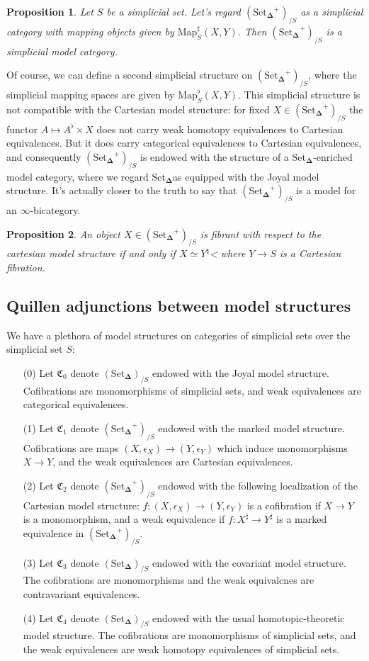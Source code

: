 \documentclass[12pt]{amsart}
\newcommand{\8}{\ensuremath{\infty}}
\newcommand{\C}{\ensuremath{\mathfrak{C}}}
\newcommand{\SSet}{\ensuremath{\text{Set}_{\boldsymbol{\Delta}}}}
\newcommand{\Map}{\ensuremath{\text{Map}}}
\newtheorem{proposition}{Proposition}
\begin{document}
\begin{proposition}
  Let $S$ be a simplicial set. Let's regard $(\SSet^+)_{/S}$ as a simplicial category with mapping objects given by $\Map^\sharp_S(X, Y)$. Then $(\SSet^+)_{/S}$ is a simplicial model category.
\end{proposition}

Of course, we can define a second simplicial structure on $(\SSet^+)_{/S}$, where the simplicial mapping spaces are given by $\Map^\flat_S(X, Y)$. This simplicial structure is not compatible with the Cartesian model structure: for fixed $X \in (\SSet^+)_{/S}$ the functor $A\mapsto A^\flat\times X$ does not carry weak homotopy equivalences to Cartesian equivalences. But it does carry categorical equivalences to Cartesian equivalences, and consequently $(\SSet^+)_{/S}$ is endowed with the structure of a \SSet-enriched model category, where we regard \SSet as equipped with the Joyal model structure. It's actually closer to the truth to say that $(\SSet^+)_{/S}$ is a model for an \8-bicategory.


\begin{proposition}
  An object $X \in (\SSet^+)_{/S}$ is fibrant with respect to the cartesian model structure if and only if $X\simeq Y^\natural$< where $Y \rightarrow S$ is a Cartesian fibration.
\end{proposition}

\subsection{Quillen adjunctions between model structures}

We have a plethora of model structures on categories of simplicial sets over the simplicial set $S$:

\begin{itemize}
  \item[(0)] Let $\C_0$ denote $(\SSet)_{/S}$ endowed with the Joyal model structure. Cofibrations are monomorphisms of simplicial sets, and weak equivalences are categorical equivalences.
  \item[(1)]  Let $\C_1$ denote $(\SSet^+)_{/S}$ endowed with the marked model structure. Cofibrations are maps $(X, \epsilon_X) \rightarrow (Y, \epsilon_Y)$ which induce monomorphisms $X \rightarrow Y$, and the weak equivalences are Cartesian equivalences.
  \item[(2)]  Let $\C_2$ denote $(\SSet^+)_{/S}$ endowed with the following localization of the Cartesian model structure: $f : (X, \epsilon_X) \rightarrow (Y, \epsilon_Y)$ is a cofibration if $X \rightarrow Y$ is a monomorphism, and a weak equivalence if $f : X^\sharp \rightarrow Y^\sharp$ is a marked equivalence in $(\SSet^+)_{/S}$.
  \item[(3)]  Let $\C_3$ denote $(\SSet)_{/S}$ endowed with the covariant model structure. The cofibrations are monomorphisms and the weak equivalcnes are contravariant equivalences.
  \item[(4)] Let $\C_4$ denote $(\SSet)_{/S}$ endowed with the usual homotopic-theoretic model structure. The cofibrations are monomorphisms of simplicial sets, and the weak equivalences are weak homotopy equivalences of simplicial sets.
\end{itemize}
\end{document}
